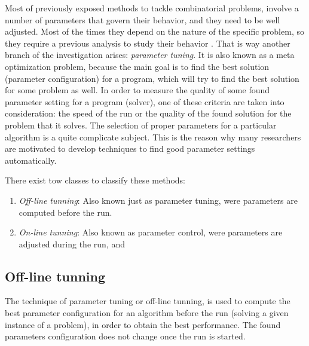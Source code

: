 Most of previously exposed methods to tackle combinatorial problems, involve a number of parameters that govern their behavior, and they need to be well adjusted. Most of the times they depend on the nature of the specific problem, so they require a previous analysis to study their behavior \cite{Birattari2005}. That is way another branch of the investigation arises: {\it parameter tuning}. It is also known as a meta optimization problem, because the main goal is to find the best solution (parameter configuration) for a program, which will try to find the best solution for some problem as well. In order to measure the quality of some found parameter setting for a program (solver), one of these criteria are taken into consideration: the speed of the run or the quality of the found solution for the problem that it solves. The selection of proper parameters for a particular algorithm is a quite complicate subject. This is the reason why many researchers are motivated to develop techniques to find good parameter settings automatically.

There exist tow classes to classify these methods: 
\begin{enumerate}
\item \textit{Off-line tunning}: Also known just as parameter tuning, were parameters are computed before the run.
\item \textit{On-line tunning}: Also known as parameter control, were parameters are adjusted during the run, and
\end{enumerate}

\subsection{Off-line tunning}

The technique of parameter tuning or off-line tunning, is used to compute the best parameter configuration for an algorithm before the run (solving a given instance of a problem), in order to obtain the best performance. The found parameters configuration does not change once the run is started. 

